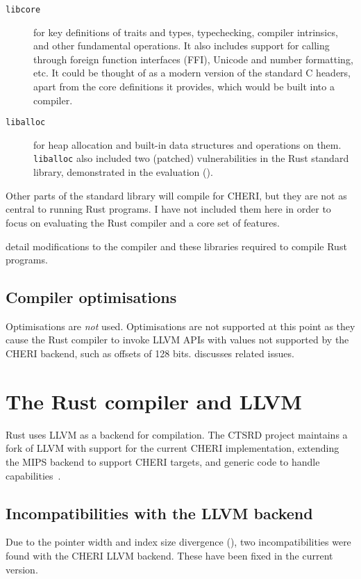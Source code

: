 \documentclass[dissertation.tex]{subfiles}
\begin{document}
\begin{description}
    \item[\texttt{libcore}] for key definitions of traits and types,
    typechecking, compiler intrinsics, and other fundamental operations.
    It also includes support for calling through foreign function
    interfaces (FFI), Unicode and number formatting, etc.
    It could be thought of as a modern version of the standard C
    headers, apart from the core definitions it provides, which would be
    built into a compiler.
    \item[\texttt{liballoc}] for heap allocation and built-in data
    structures and operations on them.
    \texttt{liballoc} also included two (patched) vulnerabilities in the
    Rust standard library, demonstrated in the evaluation
    ().
\end{description}

Other parts of the standard library will compile for CHERI, but they are
not as central to running Rust programs.
I have not included them here in order to focus on evaluating the Rust
compiler and a core set of features.

 detail modifications to
the compiler and these libraries required to compile Rust programs.

\subsection{Compiler optimisations}
Optimisations are \emph{not} used.
Optimisations are not supported at this point as they cause the Rust
compiler to invoke LLVM APIs with values not supported by the CHERI
backend, such as offsets of 128 bits.
 discusses related issues.


\section{The Rust compiler and LLVM}
\label{sec:impl-rustllvm}

Rust uses LLVM as a backend for compilation.
The CTSRD project maintains a fork of LLVM with support for the
current CHERI implementation, extending the MIPS backend to
support CHERI targets, and generic code to handle
capabilities~\cite{cheri-prog-guide}.

\subsection{Incompatibilities with the LLVM backend}
Due to the pointer width and index size divergence
(), two incompatibilities were found with the CHERI
LLVM backend.
These have been fixed in the current version.
\end{document}
